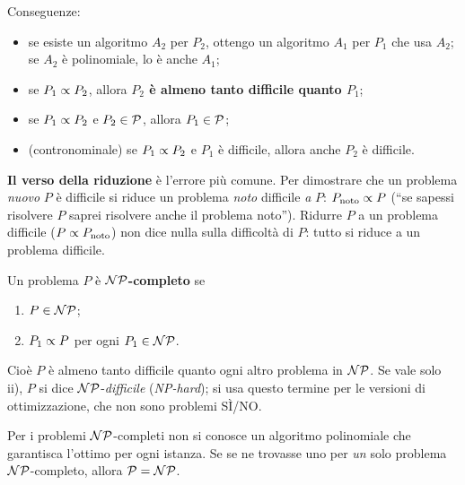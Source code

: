 \begin{center}
\end{center}

Conseguenze:
\begin{itemize}[nosep]
\item se esiste un algoritmo $A_2$ per $P_2$, ottengo un algoritmo $A_1$ per $P_1$ che usa $A_2$; se $A_2$ è polinomiale, lo è anche $A_1$;
\item se $P_1\propto P_2$, allora \textbf{$P_2$ è almeno tanto difficile quanto $P_1$};
\item se $P_1\propto P_2$ e $P_2\in\mathcal{P}$, allora $P_1\in\mathcal{P}$;
\item (contronominale) se $P_1\propto P_2$ e $P_1$ è difficile, allora anche $P_2$ è difficile.
\end{itemize}

\begin{esame}
\textbf{Il verso della riduzione} è l'errore più comune. Per dimostrare che un problema \emph{nuovo} $P$ è difficile si riduce un problema \emph{noto} difficile \emph{a} $P$: $P_{\text{noto}}\propto P$ (``se sapessi risolvere $P$ saprei risolvere anche il problema noto''). Ridurre $P$ a un problema difficile ($P\propto P_{\text{noto}}$) non dice nulla sulla difficoltà di $P$: tutto si riduce a un problema difficile.
\end{esame}

\begin{defbox}[$\NP$-completo]
Un problema $P$ è \textbf{$\NP$-completo} se
\begin{enumerate}[label=\roman*),nosep]
\item $P\in\mathcal{NP}$;
\item $P_1\propto P$ per ogni $P_1\in\mathcal{NP}$.
\end{enumerate}
Cioè $P$ è almeno tanto difficile quanto ogni altro problema in $\NP$. Se vale solo ii), $P$ si dice $\NP$-\emph{difficile} (\emph{NP-hard}); si usa questo termine per le versioni di ottimizzazione, che non sono problemi SÌ/NO.
\end{defbox}
Per i problemi $\NP$-completi non si conosce un algoritmo polinomiale che garantisca l'ottimo per ogni istanza. Se se ne trovasse uno per \emph{un} solo problema $\NP$-completo, allora $\mathcal{P}=\mathcal{NP}$.

